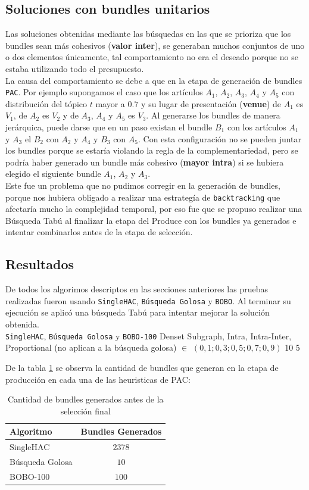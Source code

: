\subsection{Soluciones con bundles unitarios}
Las soluciones obtenidas mediante las búsquedas en las que se prioriza que los bundles sean más cohesivos (\textbf{valor inter}), se generaban muchos conjuntos de uno o dos elementos únicamente, tal comportamiento no era el deseado porque no se estaba utilizando todo el presupuesto.\\
La causa del comportamiento se debe a que en la etapa de generación de bundles \texttt{PAC}. Por ejemplo supongamos el caso que los artículos $A_1$, $A_2$, $A_3$, $A_4$ y $A_5$ con distribución del tópico $t$ mayor a $0.7$ y su lugar de presentación (\textbf{venue}) de $A_1$ es $V_1$, de $A_2$ es $V_2$ y de $A_3$, $A_4$ y $A_5$ es $V_3$. Al generarse los bundles de manera jerárquica, puede darse que en un paso existan el bundle $B_1$ con los artículos $A_1$ y $A_3$ el $B_2$ con $A_2$ y $A_4$ y $B_3$ con $A_5$. Con esta configuración no se pueden juntar los bundles porque se estaría violando la regla de la complementariedad, pero se podría haber generado un bundle más cohesivo (\textbf{mayor intra}) si se hubiera elegido el siguiente bundle $A_1$, $A_2$ y $A_3$.\\
Este fue un problema que no pudimos corregir en la generación de bundles, porque nos hubiera obligado a realizar una estrategía de \texttt{backtracking} que afectaría mucho la complejidad temporal, por eso fue que se propuso realizar una Búsqueda Tabú al finalizar la etapa del Produce con los bundles ya generados e intentar combinarlos antes de la etapa de selección.
\subsection{Resultados}
De todos los algorimos descriptos en las secciones anteriores las pruebas realizadas fueron usando \texttt{SingleHAC}, \texttt{Búsqueda Golosa} y \texttt{BOBO}. Al terminar su ejecución se aplicó una búsqueda Tabú para intentar mejorar la solución obtenida.\\
\Solucion
{}
{\texttt{SingleHAC}, \texttt{Búsqueda Golosa} y \texttt{BOBO-100}}
{Denset Subgraph, Intra, Intra-Inter, Proportional (no aplican a la búsqueda golosa)}
{$\in$ $(0,1; 0,3; 0,5; 0,7; 0,9)$}
{10}
{5}

De la tabla \ref{res:tbl-cant-bundles} se observa la cantidad de bundles que generan en la etapa de producción en cada una de las heuristicas de PAC:\\
\begin{table}[h]
  \centering
  \resizebox{0.5\textwidth}{!} {
    \begin{tabular}{|lc|}
    \hline
    Algoritmo & Bundles Generados \\
    \hline
    SingleHAC & $2378$ \\
    Búsqueda Golosa & $10$ \\
    BOBO-100 & $100$ \\
    \hline
    \end{tabular}
  }
    \caption {Cantidad de bundles generados antes de la selección final}
    \label{res:tbl-cant-bundles}
\end{table}
\newpage


